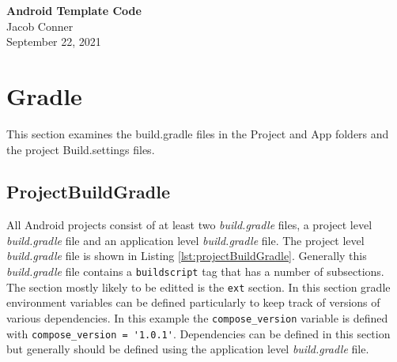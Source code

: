 \documentclass[12pt]{article}
\begin{document}
\begin{centering}
{\large\textbf{Android Template Code}}\\ %
Jacob Conner\\                     %
September 22, 2021\\                      %
\end{centering}

\tableofcontents

\section{Gradle}
This section examines the build.gradle files in the Project and App folders and the project Build.settings files. 
\newpage
\subsection{ProjectBuildGradle}

All Android projects consist of at least two \textit{build.gradle} files, a project level \textit{build.gradle} file and an application level \textit{build.gradle} file. The project level \textit{build.gradle} file is shown in Listing  \ref{lst:projectBuildGradle}. Generally this 
\textit{build.gradle} file contains a \verb|buildscript| tag that has a number of subsections. The section mostly likely to be 
editted is the \verb|ext| section. In this section gradle environment variables can be defined particularly to keep track 
of versions of various dependencies. In this example the \verb|compose_version| variable is defined with \verb|compose_version = '1.0.1'|. Dependencies can be defined in this section but generally should be defined using the application level \textit{build.gradle} file. 

\newpage
\end{document}
